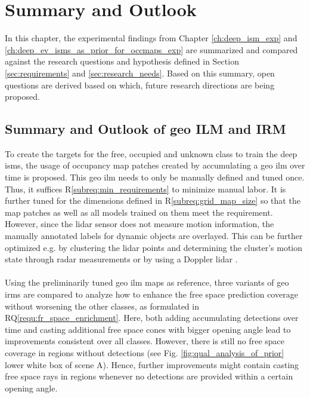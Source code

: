 \chapter{Summary and Outlook}
\label{ch:discussion_of_req_n_rq}
In this chapter, the experimental findings from Chapter \ref{ch:deep_ism_exp} and \ref{ch:deep_ev_isms_as_prior_for_occmaps_exp} are summarized and compared against the research questions and hypothesis defined in Section \ref{sec:requirements} and \ref{sec:research_needs}. Based on this summary, open questions are derived based on which, future research directions are being proposed.
%
\section{Summary and Outlook of geo ILM and IRM}
\label{sec:disc_of_geo_ilm_n_irm}
To create the targets for the free, occupied and unknown class to train the deep \gls{ism}s, the usage of occupancy map patches created by accumulating a geo \gls{ilm} over time is proposed. This geo \gls{ilm} needs to only be manually defined and tuned once. Thus, it suffices R\ref{subreq:min_requirements} to minimize manual labor. It is further tuned for the dimensions defined in R\ref{subreq:grid_map_size} so that the map patches as well as all models trained on them meet the requirement. However, since the lidar sensor does not measure motion information, the manually annotated labels for dynamic objects are overlayed. This can be further optimized e.g. by clustering the lidar points and determining the cluster's motion state through radar measurements or by using a Doppler lidar \cite{ma2019moving}.
\\\\
Using the preliminarily tuned geo \gls{ilm} maps as reference, three variants of geo \gls{irm}s are compared to analyze how to enhance the free space prediction coverage without worsening the other classes, as formulated in RQ\ref{requ:fr_space_enrichment}. Here, both adding accumulating detections over time and casting additional free space cones with bigger opening angle lead to improvements consistent over all classes. However, there is still no free space coverage in regions without detections (see Fig. \ref{fig:qual_analysis_of_prior} lower white box of scene A). Hence, further improvements might contain casting free space rays in regions whenever no detections are provided within a certain opening angle.

